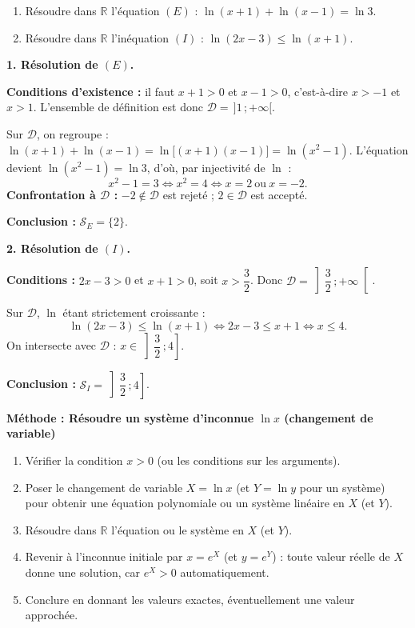 \documentclass[11pt]{article}
\newcommand{\cle}[1]{{\popxbold\color{popdark}#1}}
\begin{document}
\begin{exoresolu}
\begin{enumerate}
\item Résoudre dans $\mathbb{R}$ l'équation $(E)$ : $\ln(x+1)+\ln(x-1)=\ln 3$.
\item Résoudre dans $\mathbb{R}$ l'inéquation $(I)$ : $\ln(2x-3)\leqslant \ln(x+1)$.
\end{enumerate}
\tcblower
\textbf{1. Résolution de $(E)$.}

\textbf{Conditions d'existence :} il faut $x+1>0$ et $x-1>0$, c'est-à-dire $x>-1$ et $x>1$. L'ensemble de définition est donc $\mathcal{D}=\,]1\,;+\infty[$.

Sur $\mathcal{D}$, on regroupe : $\ln(x+1)+\ln(x-1)=\ln\big[(x+1)(x-1)\big]=\ln(x^2-1)$.
L'équation devient $\ln(x^2-1)=\ln 3$, d'où, par injectivité de $\ln$ :
\[ x^2-1=3 \iff x^2=4 \iff x=2 \ \text{ou}\ x=-2. \]
\textbf{Confrontation à $\mathcal{D}$ :} $-2\notin\mathcal{D}$ est rejeté ; $2\in\mathcal{D}$ est accepté.

\textbf{Conclusion :} $\mathcal{S}_E=\{2\}$.

\textbf{2. Résolution de $(I)$.}

\textbf{Conditions :} $2x-3>0$ et $x+1>0$, soit $x>\dfrac{3}{2}$. Donc $\mathcal{D}=\left]\dfrac{3}{2}\,;+\infty\right[$.

Sur $\mathcal{D}$, $\ln$ étant strictement croissante :
\[ \ln(2x-3)\leqslant\ln(x+1) \iff 2x-3\leqslant x+1 \iff x\leqslant 4. \]
On intersecte avec $\mathcal{D}$ : $x\in\left]\dfrac{3}{2}\,;4\right]$.

\textbf{Conclusion :} $\mathcal{S}_I=\left]\dfrac{3}{2}\,;4\right]$.
\end{exoresolu}

\textbf{Méthode : Résoudre un système d'inconnue $\ln x$ (changement de variable)}\par
\begin{methode}[Poser $X=\ln x$]
\begin{enumerate}
\item Vérifier la condition $x>0$ (ou les conditions sur les arguments).
\item Poser le \cle{changement de variable} $X=\ln x$ (et $Y=\ln y$ pour un système) pour obtenir une équation polynomiale ou un système linéaire en $X$ (et $Y$).
\item Résoudre dans $\mathbb{R}$ l'équation ou le système en $X$ (et $Y$).
\item Revenir à l'inconnue initiale par $x=e^{X}$ (et $y=e^{Y}$) : toute valeur réelle de $X$ donne une solution, car $e^X>0$ automatiquement.
\item Conclure en donnant les valeurs exactes, éventuellement une valeur approchée.
\end{enumerate}
\end{methode}
\end{document}
